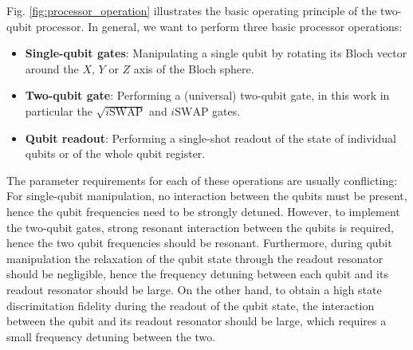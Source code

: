 Fig. \ref{fig:processor_operation} illustrates the basic operating principle of the two-qubit processor. In general, we want to perform three basic processor operations: 

\begin{itemize}
\item \textbf{Single-qubit gates}: Manipulating a single qubit by rotating its Bloch vector around the $X$, $Y$ or $Z$ axis of the Bloch sphere.
\item \textbf{Two-qubit gate}: Performing a (universal) two-qubit gate, in this work in particular the $\sqrt{i\mathrm{SWAP}}$ and $i\mathrm{SWAP}$ gates.
\item \textbf{Qubit readout}: Performing a single-shot readout of the state of individual qubits or of the whole qubit register.
\end{itemize}

The parameter requirements for each of these operations are usually conflicting: For single-qubit manipulation, no interaction between the qubits must be present, hence the qubit frequencies need to be strongly detuned. However, to implement the two-qubit gates, strong resonant interaction between the qubits is required, hence the two qubit frequencies should be resonant. Furthermore, during qubit manipulation the relaxation of the qubit state through the readout resonator should be negligible, hence the frequency detuning between each qubit and its readout resonator should be large. On the other hand, to obtain a high state discrimitation fidelity during the readout of the qubit state, the interaction between the qubit and its readout resonator should be large, which requires a small frequency detuning between the two.

\small

